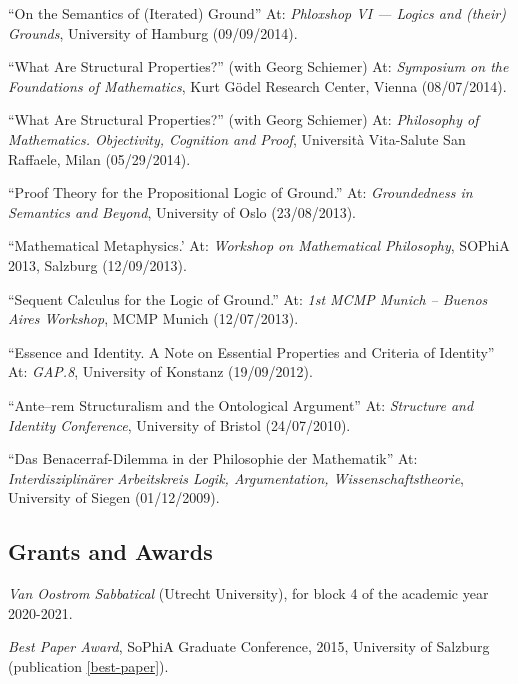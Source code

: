 \begin{etaremune}
  \item ``On the Semantics of (Iterated) Ground'' At: \emph{Phloxshop VI --- Logics and (their) Grounds}, University of Hamburg (09/09/2014).
  \item ``What Are Structural Properties?'' (with Georg Schiemer) At: \emph{Symposium on the Foundations of Mathematics}, Kurt G\"odel Research Center, Vienna (08/07/2014).
  \item ``What Are Structural Properties?'' (with Georg Schiemer) At: \emph{Philosophy of Mathematics. Objectivity, Cognition and Proof}, Universit\`a Vita-Salute San Raffaele, Milan (05/29/2014).
  \item ``Proof Theory for the Propositional Logic of Ground.'' At: \emph{Groundedness in Semantics and Beyond}, University of Oslo (23/08/2013).
  \item ``Mathematical Metaphysics.' At: \emph{Workshop on Mathematical Philosophy}, SOPhiA 2013, Salzburg (12/09/2013).
  \item ``Sequent Calculus for the Logic of Ground.'' At: \emph{1st MCMP Munich -- Buenos Aires Workshop}, MCMP Munich (12/07/2013).
  \item ``Essence and Identity. A Note on Essential Properties and Criteria of Identity'' At: \emph{GAP.8}, University of Konstanz (19/09/2012).
  \item ``Ante--rem Structuralism and the Ontological Argument'' At: \emph{Structure and Identity Conference}, University of Bristol (24/07/2010).
  \item ``Das Benacerraf-Dilemma in der Philosophie der Mathematik'' At: \emph{Interdisziplin\"arer Arbeitskreis Logik, Argumentation, Wissenschaftstheorie}, University of Siegen (01/12/2009).
\end{etaremune}

\subsection*{Grants and Awards}

\begin{etaremune}
  \item \emph{Van Oostrom Sabbatical} (Utrecht University), for block 4 of the academic year 2020-2021.
  \item \emph{Best Paper Award}, SoPhiA Graduate Conference, 2015, University of Salzburg (publication \ref{best-paper}).
\end{etaremune}

